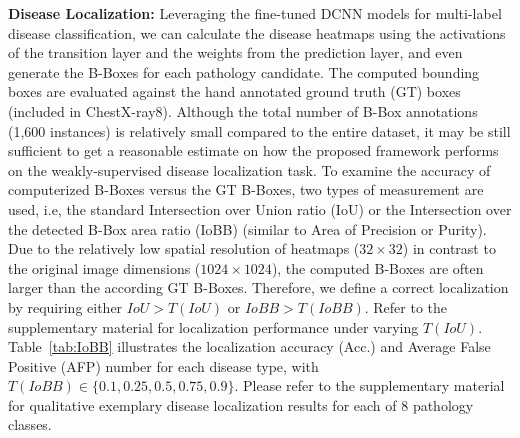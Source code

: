 \documentclass[10pt,twocolumn,letterpaper]{article}
\begin{document}
{\bf Disease Localization:}
Leveraging the fine-tuned DCNN models for multi-label disease classification, we can calculate the disease heatmaps using the activations of the transition layer and the weights from the prediction layer, and even generate the B-Boxes for each pathology candidate. The computed bounding boxes are evaluated against the hand annotated ground truth (GT) boxes (included in ChestX-ray8). Although the total number of B-Box annotations (1,600 instances) is relatively small compared to the entire dataset, it may be still sufficient to get a reasonable estimate on how the proposed framework performs on the weakly-supervised disease localization task. To examine the accuracy of computerized B-Boxes versus the GT B-Boxes, two types of measurement are used, i.e, the standard Intersection over Union ratio (IoU) or the Intersection over the detected B-Box area ratio (IoBB) (similar to Area of Precision or Purity). Due to the relatively low spatial resolution of heatmaps ($32\times 32$) in contrast to the original image dimensions ($1024\times 1024$), the computed B-Boxes are often larger than the according GT B-Boxes. Therefore, we define a correct localization by requiring either $IoU > T(IoU)$ or $IoBB > T(IoBB)$. Refer to the supplementary material for localization performance under varying $T(IoU)$. Table~\ref{tab:IoBB} illustrates the localization accuracy (Acc.) and Average False Positive (AFP) number for each disease type, with $T(IoBB)\in \{0.1, 0.25, 0.5, 0.75, 0.9\}$. Please refer to the supplementary material for qualitative exemplary disease localization results for each of 8 pathology classes. %



\end{document}
